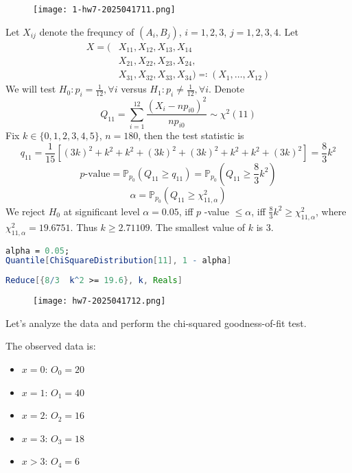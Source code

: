 \begin{exercise}
\begin{figure}[H]
\centering
\texttt{[image: 1-hw7-2025041711.png]}
\label{}
\end{figure}
\end{exercise}
Let $X_{ij}$ denote the frequncy of $(A_i,B_j)$, $i=1,2,3$, $j=1,2,3,4$. Let
\[
\begin{aligned}
X =( & X_{11},X_{12},X_{13},X_{14} \\
 & X_{21},X_{22},X_{23},X_{24}, \\
 & X_{31},X_{32},X_{33},X_{34})\eqqcolon (X_1,\dots,X_{12})
\end{aligned}
\]
We will test $H_0:p_{i}=\frac{1}{12},\forall i$ versus $H_1:p_{i}\neq\frac{1}{12},\forall i$. Denote
\[
Q_{11}=\sum_{i=1}^{12} \frac{(X_i-np_{i0})^2}{np_{i0}}\sim \chi^{2}(11)
\]
Fix $k\in \{ 0,1,2,3,4,5 \}$, $n=180$, then the test statistic is
\[
q_{11} = \frac{1}{15}[(3k)^2+k^2+k^2+(3k)^2+(3k)^2+k^2+k^2+(3k)^2]=\frac{8}{3}k^2
\]
\[
p\text{-value}=\mathbb{P}_{p_0}(Q_{11}\geq q_{11})=\mathbb{P}_{p_0}\left( Q_{11}\geq \frac{8}{3}k^2 \right)
\]
\[
\alpha=\mathbb{P}_{p_0}(Q_{11}\geq \chi^{2}_{11,\alpha})
\]
We reject $H_0$ at significant level $\alpha=0.05$, iff $p$ -value $\leq\alpha$, iff $\frac{8}{3}k^2\geq \chi^{2}_{11,\alpha}$, where $\chi^{2}_{11,\alpha}=19.6751$. Thus $k \geq 2.71109$. The smallest value of $k$ is $3$.

\begin{lstlisting}[language=mathematica]
alpha = 0.05;
Quantile[ChiSquareDistribution[11], 1 - alpha]
\end{lstlisting}
\begin{lstlisting}[language=mathematica]
Reduce[{8/3  k^2 >= 19.6}, k, Reals]
\end{lstlisting}
\begin{exercise}
\begin{figure}[H]
\centering
\texttt{[image: hw7-2025041712.png]}
\label{}
\end{figure}
\end{exercise}
Let's analyze the data and perform the chi-squared goodness-of-fit test.

The observed data is:

\begin{itemize}
	\item $x=0$: $O_0 = 20$
	\item $x=1$: $O_1 = 40$
	\item $x=2$: $O_2 = 16$
	\item $x=3$: $O_3 = 18$
	\item $x>3$: $O_4 = 6$
\end{itemize}


